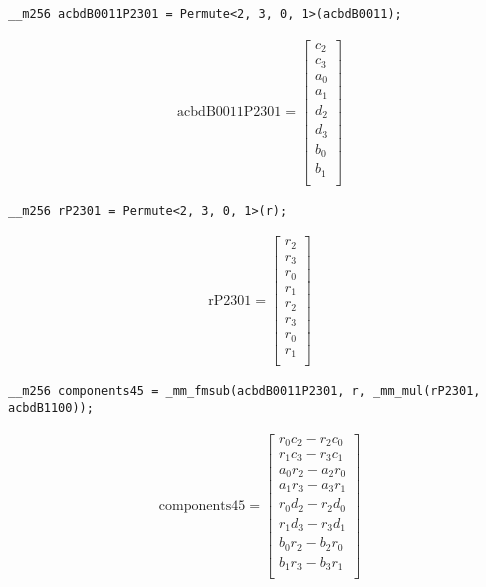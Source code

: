 \begin{verbatim}
__m256 acbdB0011P2301 = Permute<2, 3, 0, 1>(acbdB0011);
\end{verbatim} 
\begin{align*}
\mathrm{acbdB0011P2301} 
=
\begin{bmatrix}
c_2\\
c_3\\
a_0\\
a_1\\
d_2\\
d_3\\
b_0\\
b_1\\
\end{bmatrix}
\end{align*}


\begin{verbatim}
__m256 rP2301 = Permute<2, 3, 0, 1>(r);
\end{verbatim} 
\begin{align*}
\mathrm{rP2301} 
=
\begin{bmatrix}
r_2\\
r_3\\
r_0\\
r_1\\
r_2\\
r_3\\
r_0\\
r_1\\
\end{bmatrix}
\end{align*}

\begin{verbatim}
__m256 components45 = _mm_fmsub(acbdB0011P2301, r, _mm_mul(rP2301, acbdB1100));
\end{verbatim} 
\begin{align*}
\mathrm{components45} 
=
\begin{bmatrix}
r_0c_2 - r_2c_0\\
r_1c_3 - r_3c_1\\
a_0r_2 - a_2r_0\\
a_1r_3 - a_3r_1\\
r_0d_2 - r_2d_0\\
r_1d_3 - r_3d_1\\
b_0r_2 - b_2r_0\\
b_1r_3 - b_3r_1\\
\end{bmatrix}
\end{align*}


